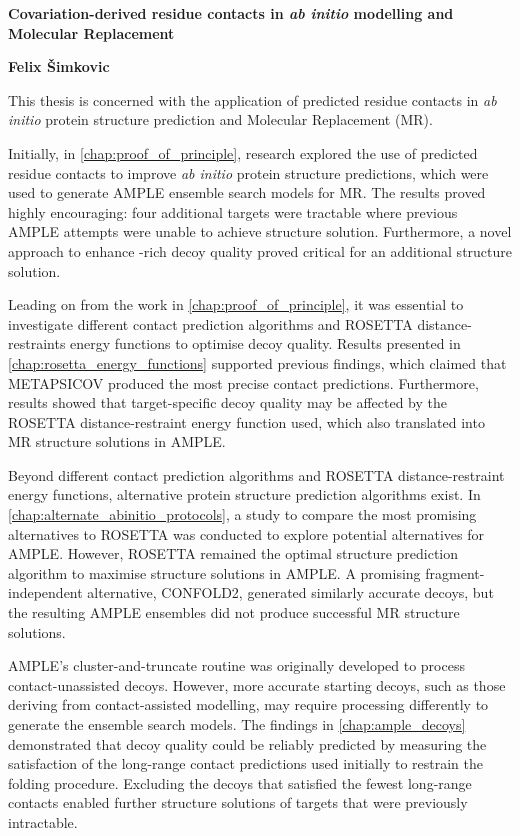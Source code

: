 \begin{center}
    \Large
    \textbf{Covariation-derived residue contacts in \textit{ab initio} modelling and Molecular Replacement}

    \vspace{0.5cm}
    \textbf{Felix \v{S}imkovic}
    \vspace{0.5cm}
\end{center}

\singlespacing
This thesis is concerned with the application of predicted residue contacts in \textit{ab initio} protein structure prediction and Molecular Replacement (MR).

Initially, in \cref{chap:proof_of_principle}, research explored the use of predicted residue contacts to improve \textit{ab initio} protein structure predictions, which were used to generate AMPLE ensemble search models for MR. The results proved highly encouraging: four additional targets were tractable where previous AMPLE attempts were unable to achieve structure solution. Furthermore, a novel approach to enhance \textbeta-rich decoy quality proved critical for an additional structure solution. 

Leading on from the work in \cref{chap:proof_of_principle}, it was essential to investigate different contact prediction algorithms and ROSETTA distance-restraints energy functions to optimise decoy quality. Results presented in \cref{chap:rosetta_energy_functions} supported previous findings, which claimed that METAPSICOV produced the most precise contact predictions. Furthermore, results showed that target-specific decoy quality may be affected by the ROSETTA distance-restraint energy function used, which also translated into MR structure solutions in AMPLE.

Beyond different contact prediction algorithms and ROSETTA distance-restraint energy functions, alternative protein structure prediction algorithms exist. In \cref{chap:alternate_abinitio_protocols}, a study to compare the most promising alternatives to ROSETTA was conducted to explore potential alternatives for AMPLE. However, ROSETTA remained the optimal structure prediction algorithm to maximise structure solutions in AMPLE. A promising fragment-independent alternative, CONFOLD2, generated similarly accurate decoys, but the resulting AMPLE ensembles did not produce successful MR structure solutions.

AMPLE's cluster-and-truncate routine was originally developed to process contact-unassisted decoys. However, more accurate starting decoys, such as those deriving from contact-assisted modelling, may require processing differently to generate the ensemble search models. The findings in \cref{chap:ample_decoys} demonstrated that decoy quality could be reliably predicted by measuring the satisfaction of the long-range contact predictions used initially to restrain the folding procedure. Excluding the decoys that satisfied the fewest long-range contacts enabled further structure solutions of targets that were previously intractable.

